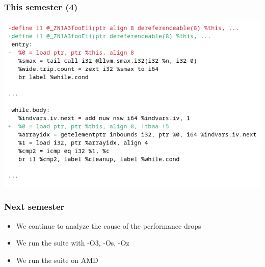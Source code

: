 \documentclass[
	12pt
]{beamer}
\begin{document}
\begin{frame}
  \frametitle{This semester (4)}
  \begin{center}
    \includegraphics[width=1.0\linewidth]{align-diff.png}
  \end{center}
\end{frame}

\begin{frame}
  \frametitle{Next semester}
  \begin{itemize}
    \item We continue to analyze the cause of the performance drops
    \item We run the suite with -O3, -Os, -Oz 
    \item We run the suite on AMD
  \end{itemize}
\end{frame}
\end{document}
